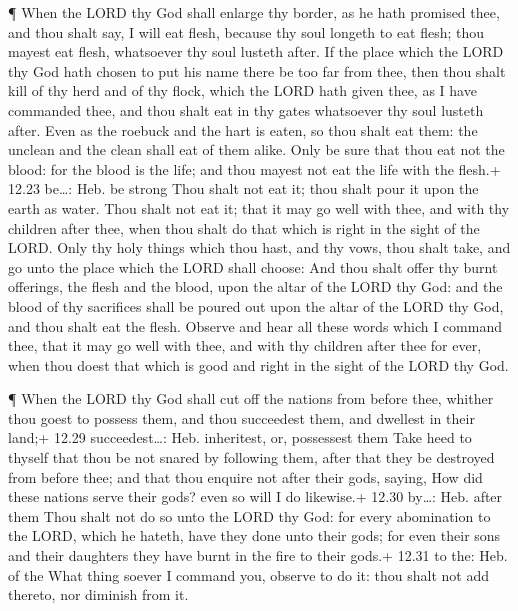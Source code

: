  ¶ When the LORD thy God shall enlarge thy border, as he
hath promised thee, and thou shalt say, I will eat flesh, because thy
soul longeth to eat flesh; thou mayest eat flesh, whatsoever thy soul
lusteth after.  If the place which the LORD thy God hath
chosen to put his name there be too far from thee, then thou shalt kill
of thy herd and of thy flock, which the LORD hath given thee, as I have
commanded thee, and thou shalt eat in thy gates whatsoever thy soul
lusteth after.  Even as the roebuck and the hart is eaten,
so thou shalt eat them: the unclean and the clean shall eat of them
alike.  Only be sure that thou eat not the blood: for the
blood is the life; and thou mayest not eat the life with the flesh.+
12.23 be\ldots: Heb. be strong  Thou shalt not eat it; thou
shalt pour it upon the earth as water.  Thou shalt not eat
it; that it may go well with thee, and with thy children after thee,
when thou shalt do that which is right in the sight of the LORD.
 Only thy holy things which thou hast, and thy vows, thou
shalt take, and go unto the place which the LORD shall choose:
 And thou shalt offer thy burnt offerings, the flesh and
the blood, upon the altar of the LORD thy God: and the blood of thy
sacrifices shall be poured out upon the altar of the LORD thy God, and
thou shalt eat the flesh.  Observe and hear all these words
which I command thee, that it may go well with thee, and with thy
children after thee for ever, when thou doest that which is good and
right in the sight of the LORD thy God.

 ¶ When the LORD thy God shall cut off the nations from
before thee, whither thou goest to possess them, and thou succeedest
them, and dwellest in their land;+ 12.29 succeedest\ldots: Heb.
inheritest, or, possessest them  Take heed to thyself that
thou be not snared by following them, after that they be destroyed from
before thee; and that thou enquire not after their gods, saying, How did
these nations serve their gods? even so will I do likewise.+ 12.30
by\ldots: Heb. after them  Thou shalt not do so unto the
LORD thy God: for every abomination to the LORD, which he hateth, have
they done unto their gods; for even their sons and their daughters they
have burnt in the fire to their gods.+ 12.31 to the: Heb. of the
 What thing soever I command you, observe to do it: thou
shalt not add thereto, nor diminish from it.


